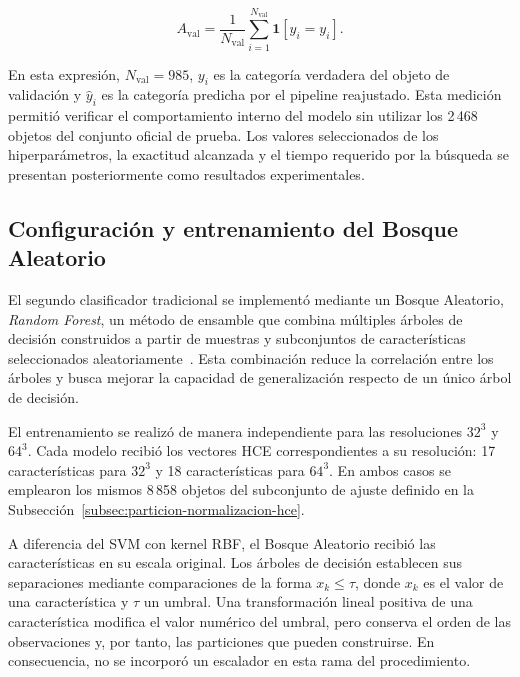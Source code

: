 \begin{equation}
A_{\mathrm{val}}
=
\frac{1}{N_{\mathrm{val}}}
\sum_{i=1}^{N_{\mathrm{val}}}
\mathbf 1
\left[
\widehat y_i=y_i
\right].
\label{eq:svm-exactitud-validacion}
\end{equation}

En esta expresión, $N_{\mathrm{val}}=985$, $y_i$ es la categoría verdadera del objeto de validación y $\widehat y_i$ es la categoría predicha por el pipeline reajustado. Esta medición permitió verificar el comportamiento interno del modelo sin utilizar los 2\,468 objetos del conjunto oficial de prueba. Los valores seleccionados de los hiperparámetros, la exactitud alcanzada y el tiempo requerido por la búsqueda se presentan posteriormente como resultados experimentales.

\subsection{Configuración y entrenamiento del Bosque Aleatorio}
\label{subsec:configuracion-bosque}

El segundo clasificador tradicional se implementó mediante un Bosque Aleatorio, \textit{Random Forest}, un método de ensamble que combina múltiples árboles de decisión construidos a partir de muestras y subconjuntos de características seleccionados aleatoriamente~\parencite{breiman2001}. Esta combinación reduce la correlación entre los árboles y busca mejorar la capacidad de generalización respecto de un único árbol de decisión.

El entrenamiento se realizó de manera independiente para las resoluciones $32^3$ y $64^3$. Cada modelo recibió los vectores HCE correspondientes a su resolución: 17 características para $32^3$ y 18 características para $64^3$. En ambos casos se emplearon los mismos 8\,858 objetos del subconjunto de ajuste definido en la Subsección~\ref{subsec:particion-normalizacion-hce}.

A diferencia del SVM con kernel RBF, el Bosque Aleatorio recibió las características en su escala original. Los árboles de decisión establecen sus separaciones mediante comparaciones de la forma $x_k\leq\tau$, donde $x_k$ es el valor de una característica y $\tau$ un umbral. Una transformación lineal positiva de una característica modifica el valor numérico del umbral, pero conserva el orden de las observaciones y, por tanto, las particiones que pueden construirse. En consecuencia, no se incorporó un escalador en esta rama del procedimiento.

